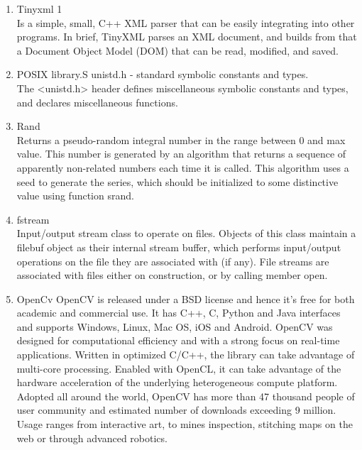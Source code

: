 \documentclass[twocolumn]{IEEEtran}
\begin{document}
\begin{enumerate}
         \item Tinyxml 1 \\
         Is a simple, small, C++ XML parser that can be easily integrating into other programs. In 
         brief, TinyXML parses an XML document, and builds from that a Document Object Model (DOM) that 
         can be read, modified, and saved.\cite{16}\\
         
         \item POSIX library.S unistd.h - standard symbolic constants and types.\\
         The <unistd.h> header defines miscellaneous symbolic constants and types, and declares 
         miscellaneous functions.\\
            
         \item Rand \\
         Returns a pseudo-random integral number in the range between 0 and max value. This number is 
         generated by an algorithm that returns a sequence of apparently non-related numbers each time 
         it is called. This algorithm uses a seed to generate the series, which should be initialized 
         to some distinctive value using function srand.\cite{17}\\
            
         \item fstream \\
         Input/output stream class to operate on files. Objects of this class maintain a filebuf object 
         as their internal stream buffer, which performs input/output operations on the file they are 
         associated with (if any). File streams are associated with files either on construction, or by 
         calling member open.\\
         
         \item OpenCv
         OpenCV is released under a BSD license and hence it’s free for both academic and commercial 
         use. It has C++, C, Python and Java interfaces and supports Windows, Linux, Mac OS, iOS and 
         Android. OpenCV was designed for computational efficiency and with a strong focus on real-time 
         applications. Written in optimized C/C++, the library can take advantage of multi-core 
         processing. Enabled with OpenCL, it can take advantage of the hardware acceleration of the 
         underlying heterogeneous compute platform. Adopted all around the world, OpenCV has more than 
         47 thousand people of user community and estimated number of downloads exceeding 9 million. 
         Usage ranges from interactive art, to mines inspection, stitching maps on the web or through 
         advanced robotics.

	\end{enumerate}
\end{document}
